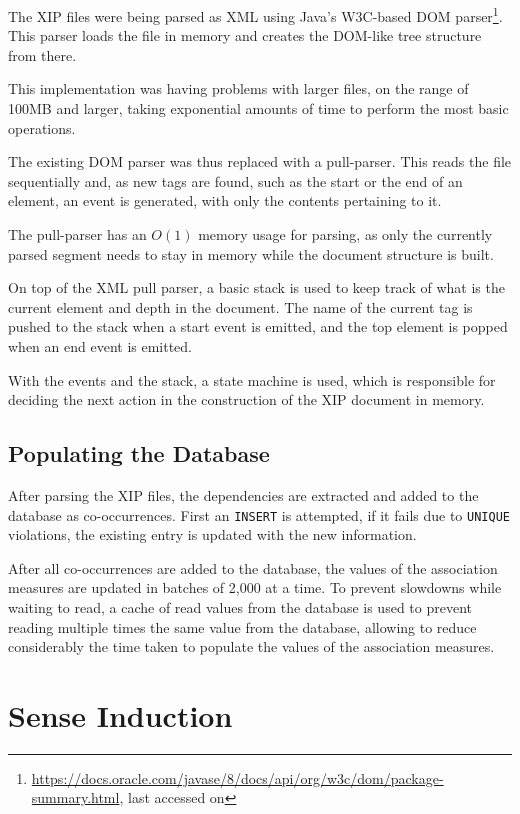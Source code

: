The \ac{XIP} files were being parsed as XML using Java's W3C-based \ac{DOM}
parser\footnote{\url{https://docs.oracle.com/javase/8/docs/api/org/w3c/dom/package-summary.html},
last accessed on }. This parser loads the file in memory and
creates the \ac{DOM}-like tree structure from there.

This implementation was having problems with larger files, on the range of
100MB and larger, taking exponential amounts of time to perform the most basic
operations.

The existing \ac{DOM} parser was thus replaced with a pull-parser. This reads
the file sequentially and, as new tags are found, such as the start or the
end of an element, an event is generated, with only the contents pertaining to 
it.

The pull-parser has an $O(1)$ memory usage for parsing, as only the currently
parsed segment needs to stay in memory while the document structure is built.

On top of the XML pull parser, a basic stack is used to keep track of what is
the current element and depth in the document. The name of the current tag
is pushed to the stack when a start event is emitted, and the top element is
popped when an end event is emitted.

With the events and the stack, a state machine is used, which is responsible for
deciding the next action in the construction of the XIP document in memory.

\subsection{Populating the Database}

After parsing the \ac{XIP} files, the dependencies are extracted and added to 
the database as co-occurrences. First an \texttt{INSERT} is attempted, if it 
fails due to \texttt{UNIQUE} violations, the existing entry is updated with the 
new information.

After all co-occurrences are added to the database, the values of the
association measures are updated in batches of 2,000 at a time. To prevent
slowdowns while waiting to read, a cache of read values from the database is
used to prevent reading multiple times the same value from the database,
allowing to reduce considerably the time taken to populate the values of the 
association measures.

\section{Sense Induction}

